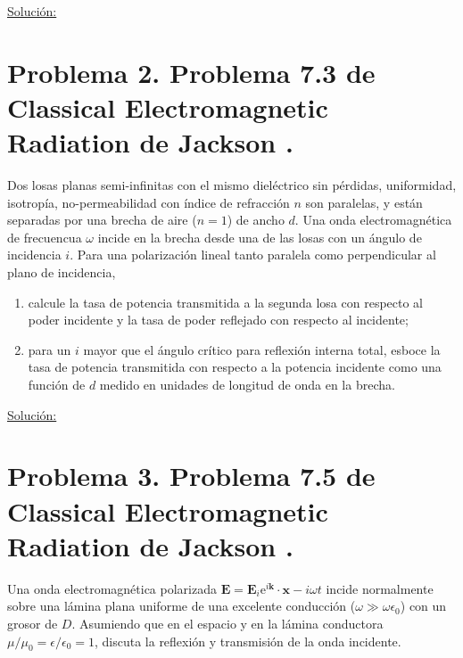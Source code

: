 \documentclass[a4paper,11pt]{article}
\numberwithin{equation}{section}
\newcommand{\euler}{\mathrm{e}}
\begin{document}
\vspace{.3cm}

\underline{Solución:} \vspace{.3cm}

\newpage

\section{Problema 2. Problema 7.3 de Classical Electromagnetic Radiation
de Jackson \cite{jackson}.}

Dos losas planas semi-infinitas con el mismo dieléctrico sin pérdidas, uniformidad,
isotropía, no-permeabilidad con índice de refracción $n$ son paralelas, y están 
separadas por una brecha de aire ($n = 1$) de ancho $d$. Una onda electromagnética 
de frecuencua $\omega$ incide en la brecha desde una de las losas con un ángulo 
de incidencia $i$. Para una polarización lineal tanto paralela como perpendicular 
al plano de incidencia,

\begin{enumerate}[label=\textbf{(\alph*)}]
 \item calcule la tasa de potencia transmitida a la segunda losa con respecto 
 al poder incidente y la tasa de poder reflejado con respecto al incidente;
 \item para un $i$ mayor que el ángulo crítico para reflexión interna total, 
 esboce la tasa de potencia transmitida con respecto a la potencia incidente 
 como una función de $d$ medido en unidades de longitud de onda en la brecha.
\end{enumerate}

\vspace{.3cm}

\underline{Solución:} \vspace{.3cm}

\newpage

\section{Problema 3. Problema 7.5 de Classical Electromagnetic Radiation
de Jackson \cite{jackson}.}

Una onda electromagnética polarizada $\mathbf{E} = \mathbf{E}_i \euler^{i\mathbf{k}} 
\cdot \mathbf{x} - i\omega t$ incide normalmente sobre una lámina plana uniforme 
de una excelente conducción ($\omega \gg \omega \epsilon_0$) con un grosor de $D$. 
Asumiendo que en el espacio y en la lámina conductora $\mu/\mu_0 = \epsilon/\epsilon_0 
= 1$, discuta la reflexión y transmisión de la onda incidente. 
\end{document}
